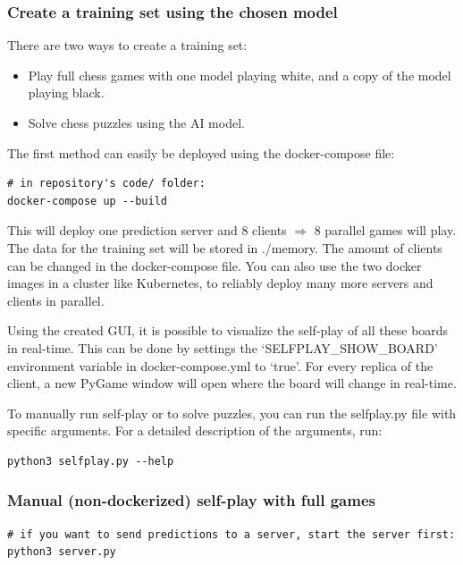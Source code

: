 \documentclass{article}
\begin{document}
\subsubsection{Create a training set using the chosen model}

There are two ways to create a training set:

\begin{itemize}
	\item Play full chess games with one model playing white, and a copy of the model playing black.
	\item Solve chess puzzles using the AI model.
\end{itemize}

The first method can easily be deployed using the docker-compose file:

\begin{verbatim}
# in repository's code/ folder:
docker-compose up --build
\end{verbatim}

This will deploy one prediction server and 8 clients $\Rightarrow$ 8 parallel games will play. 
The data for the training set will be stored in ./memory.
The amount of clients can be changed in the docker-compose file. 
You can also use the two docker images in a cluster like Kubernetes, to
reliably deploy many more servers and clients in parallel.

Using the created GUI, it is possible to visualize the self-play of all these boards in real-time.
This can be done by settings the `SELFPLAY\_SHOW\_BOARD' environment variable in docker-compose.yml to `true'.
For every replica of the client, a new PyGame window will open where the board will change in real-time. 

To manually run self-play or to solve puzzles, you can run the selfplay.py file 
with specific arguments. For a detailed description of the arguments, run:

\begin{verbatim}
python3 selfplay.py --help
\end{verbatim}

\subsubsection{Manual (non-dockerized) self-play with full games}

\begin{verbatim}
# if you want to send predictions to a server, start the server first:
python3 server.py
\end{verbatim}
\end{document}
